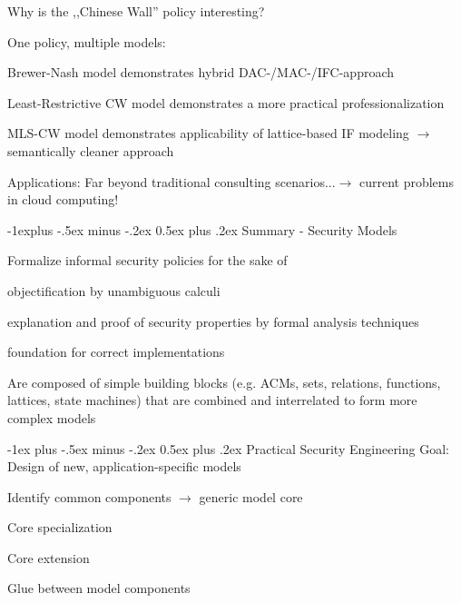 \documentclass[a4paper]{article}
\makeatletter
\renewcommand{\section}{\@startsection{section}{1}{0mm}%
                                {-1ex plus -.5ex minus -.2ex}%
                                {0.5ex plus .2ex}%
                                {\normalfont\large\bfseries}}
\renewcommand{\subsection}{\@startsection{subsection}{2}{0mm}%
                                {-1explus -.5ex minus -.2ex}%
                                {0.5ex plus .2ex}%
                                {\normalfont\normalsize\bfseries}}
\makeatother
\begin{document}
\begin{multicols}{3}
    Why is the ,,Chinese Wall'' policy interesting?
    \begin{itemize*}
        \item One policy, multiple models:
        \item Brewer-Nash model demonstrates hybrid DAC-/MAC-/IFC-approach
        \item Least-Restrictive CW model demonstrates a more practical professionalization
        \item MLS-CW model demonstrates applicability of lattice-based IF modeling $\rightarrow$ semantically cleaner approach
        \item Applications: Far beyond traditional consulting scenarios...$\rightarrow$ current problems in cloud computing!
    \end{itemize*}

    \subsection{Summary - Security Models}
    \begin{itemize*}
        \item Formalize informal security policies for the sake of
        \begin{itemize*}
            \item objectification by unambiguous calculi
            \item explanation and proof of security properties by formal analysis techniques
            \item foundation for correct implementations
        \end{itemize*}
        \item Are composed of simple building blocks (e.g. ACMs, sets, relations, functions, lattices, state machines) that are combined and interrelated to form more complex models
    \end{itemize*}

    \section{Practical Security Engineering}
    Goal: Design of new, application-specific models
    \begin{itemize*}
        \item Identify common components $\rightarrow$ generic model core
        \item Core specialization
        \item Core extension
        \item Glue between model components
    \end{itemize*}


\end{multicols}
\end{document}
